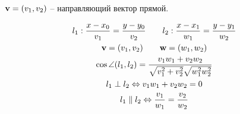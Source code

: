 \documentclass[main]{subfiles}
\begin{document}
\begin{definition}
    $\mathbf{v} = (v_1, v_2)$ -- направляющий вектор прямой.
\end{definition}
\begin{definition}
    \begin{gather*}
        l_1: \frac{x-x_0}{v_1}=\frac{y-y_0}{v_2} \qquad l_2: \frac{x-x_1}{w_1} = \frac{y-y_1}{w_2}\\
        \mathbf{v} = (v_1, v_2) \qquad \mathbf{w} = (w_1, w_2)\\
        \cos \angle(l_1, l_2) = \frac{v_1 w_1 + v_2 w_2}{\sqrt{v_1^2 + v_2^2}\sqrt{w_1^2 w_2^2}}\\
        l_1 \perp l_2 \Leftrightarrow v_1 w_1 + v_2 w_2 = 0\\
        l_1 \parallel l_2 \Leftrightarrow \frac{v_1}{w_1} = \frac{v_2}{w_2}
    \end{gather*}
\end{definition}
\end{document}
